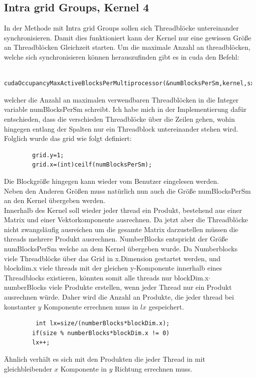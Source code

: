 \documentclass[10pt,a4paper]{article}
\begin{document}
	 \subsection{Intra grid Groups, Kernel 4}  
	 In der Methode mit Intra grid Groups sollen sich Threadblöcke untereinander synchronisieren. Damit dies funktioniert kann der Kernel nur eine gewissen Größe an Threadblöcken Gleichzeit starten. Um die maximale Anzahl an threadblöcken, welche sich synchronisieren können herauszufinden gibt es in cuda den Befehl:
	 \begin{lstlisting}
	 	cudaOccupancyMaxActiveBlocksPerMultiprocessor(&numBlocksPerSm,kernel,sx,0);
	 \end{lstlisting}
 	welcher die Anzahl an maximalen verwendbaren Threadblöcken in die Integer variable numBlocksPerSm schreibt. Ich habe mich in der Implementierung dafür entschieden, dass die verschieden Threadblöcke über die Zeilen gehen, wohin hingegen entlang der Spalten nur ein Threadblock untereinander stehen wird. Folglich wurde das grid wie folgt definiert:
 	\begin{lstlisting}
 		grid.y=1;
 		grid.x=(int)ceilf(numBlocksPerSm);
 	\end{lstlisting}
 	Die Blockgröße hingegen kann wieder vom Benutzer eingelesen werden.\\
 	Neben den Anderen Größen muss natürlich nun auch die Größe numBlocksPerSm an den Kernel übergeben werden. \\
 	Innerhalb des Kernel soll wieder jeder thread ein Produkt, bestehend aus einer Matrix und einer Vektorkomponente ausrechnen. Da jetzt aber die Threadblöcke nicht zwangsläufig ausreichen um die gesamte Matrix darzustellen müssen die threads mehrere Produkt ausrechnen. NumberBlocks entspricht der Größe numBlocksPerSm welche an dem Kernel übergeben wurde. Da Numberblocks viele Threadblöcke über das Grid in x.Dimension gestartet werden, und blockdim.x viele threads mit der gleichen y-Komponente innerhalb eines Threadblocks existieren, könnten somit alle threads nur blockDim.x$\cdot$ numberBlocks viele Produkte erstellen, wenn jeder Thread nur ein Produkt ausrechnen würde. Daher wird die Anzahl an Produkte, die jeder thread bei konstanter $y$ Komponente errechnen muss in $lx$ gespeichert.
 	\begin{lstlisting}
 		 int lx=size/(numberBlocks*blockDim.x);
 		if(size % numberBlocks*blockDim.x != 0)
 		lx++;    
 	\end{lstlisting}
 	Ähnlich verhält es sich mit den Produkten die jeder Thread in mit gleichbleibender $x$ Komponente in $y$ Richtung errechnen muss.
\end{document}
